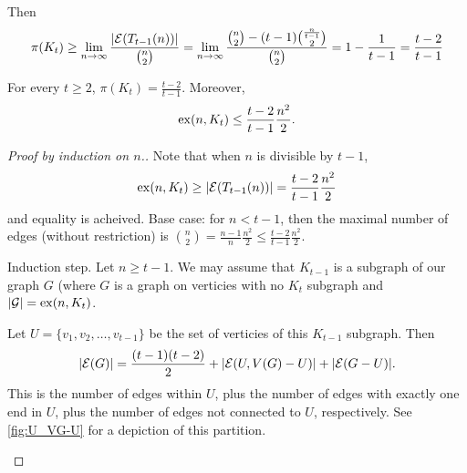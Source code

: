 Then
\[
\pi(K_t) \geq \lim_{n\to\infty} \frac{|\mathcal{E} (T_{t-1}(n))|}{{n\choose 2}} = \lim_{n\to\infty} \frac{{n\choose 2} - (t-1){\frac{n}{t-1} \choose 2}}{{n\choose 2}}= 1 - \frac{1}{t-1} = \frac{t-2}{t-1}
\]

\begin{theorem} \label{thm:turan}
For every $t\geq 2$, $\pi(K_t) = \frac{t-2}{t-1}$. Moreover,
\[
\operatorname{ex}(n,K_t)\leq \frac{t-2}{t-1} \frac{n^2}{2}.
\]
\end{theorem}
\begin{proof}[Proof by induction on $n$.] 
Note that when $n$ is divisible by $t-1$,
\[
\operatorname{ex}(n,K_t)\geq |\mathcal{E} (T_{t-1}(n))| = \frac{t-2}{t-1}\frac{n^2}{2}
\]
and equality is acheived.
Base case: for $n < t-1$, then the maximal number of edges (without restriction) is ${n\choose 2}  = \frac{n-1}{n}\frac{n^2}{2}\leq \frac{t-2}{t-1}\frac{n^2}{2}$.

Induction step. Let $n\geq t-1$. We may assume that $K_{t-1}$ is a subgraph of our graph $G$ (where $G$ is a graph on verticies with no $K_t$ subgraph and $|\mathcal{G}| = \operatorname{ex}(n,K_t)$.

Let $U=\{v_1,v_2,\dotsc,v_{t-1}\}$ be the set of verticies of this $K_{t-1}$ subgraph. Then
\[	
 |\mathcal{E} (G) | = \frac{(t-1)(t-2)}{2} + | \mathcal{E} (U,V(G)- U)| + |\mathcal{E} (G- U)|.
 \]
 This is the number of edges within $U$, plus the number of edges with exactly one end in $U$, plus the number of edges not connected to $U$, respectively. See \cref{fig:U_VG-U} for a depiction of this partition.

\begin{marginfigure}
\begin{center}
\end{center}
\end{marginfigure}
\end{proof}
